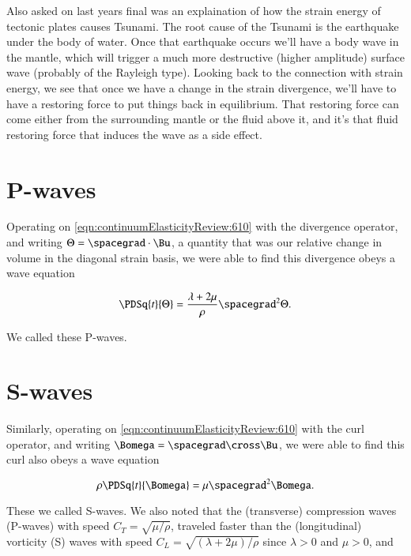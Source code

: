 Also asked on last years final was an explaination of how the strain energy of tectonic plates causes Tsunami.  The root cause of the Tsunami is the earthquake under the body of water.  Once that earthquake occurs we'll have a body wave in the mantle, which will trigger a much more destructive (higher amplitude) surface wave (probably of the Rayleigh type).  Looking back to the connection with strain energy, we see that once we have a change in the strain divergence, we'll have to have a restoring force to put things back in equilibrium.  That restoring force can come either from the surrounding mantle or the fluid above it, and it's that fluid restoring force that induces the wave as a side effect.

\section{P-waves}

Operating on \ref{eqn:continuumElasticityReview:610} with the divergence operator, and writing $\Theta = \spacegrad \cdot \Bu$, a quantity that was our relative change in volume in the diagonal strain basis, we were able to find this divergence obeys a wave equation

\begin{equation}\label{eqn:continuumElasticityReview:630}
\PDSq{t}{\Theta} = \frac{\lambda + 2 \mu}{\rho} \spacegrad^2 \Theta.
\end{equation}

We called these P-waves.

\section{S-waves}

Similarly, operating on \ref{eqn:continuumElasticityReview:610} with the curl operator, and writing $\Bomega = \spacegrad \cross \Bu$, we were able to find this curl also obeys a wave equation

\begin{equation}\label{eqn:continuumElasticityReview:650}
\rho \PDSq{t}{\Bomega} = \mu \spacegrad^2 \Bomega.
\end{equation}

These we called S-waves.  We also noted that the (transverse) compression waves (P-waves) with speed $C_T = \sqrt{\mu/\rho}$, traveled faster than the (longitudinal) vorticity (S) waves with speed $C_L = \sqrt{(\lambda + 2 \mu)/\rho}$ since $\lambda > 0$ and $\mu > 0$, and 

